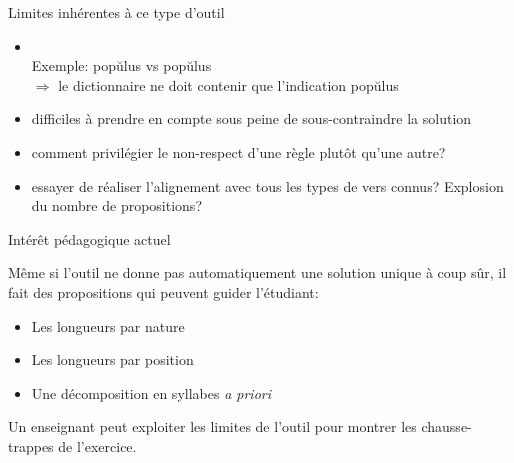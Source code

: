 \documentclass{beamer}
\newcommand\overtxt[2]{\makebox[0cm][l]{\color{diacrit}#1}#2}
\newcommand\hlbr{\overtxt{\u~}}
\newcommand\hllg{\overtxt{\=~}}
\begin{document}
\begin{frame}{Limites inhérentes à ce type d'outil}

\begin{itemize}
\item {}\\
Exemple: p\hlbr{o}p\u{u}lus vs p\hllg{o}p\u{u}lus \\
$\Rightarrow$ le dictionnaire ne doit contenir que l'indication pop\u{u}lus

\vfill

\item {} difficiles à prendre en compte sous peine de sous-contraindre la solution

\vfill

\item {} comment privilégier le non-respect d'une règle plutôt qu'une autre?

\vfill

\item {} essayer de réaliser l'alignement avec tous les types de vers connus? Explosion du nombre de propositions?

\end{itemize}
\end{frame} %




\begin{frame}{Intérêt pédagogique actuel}

Même si l'outil ne donne pas automatiquement une solution unique à coup sûr, il fait des propositions qui peuvent guider l'étudiant:

\begin{itemize}
\item Les longueurs par nature
\item Les longueurs par position
\item Une décomposition en syllabes \emph{a priori}
\end{itemize}

\vfill

Un enseignant peut exploiter les limites de l'outil pour montrer les chausse-trappes de l'exercice.

\end{frame} %
\end{document}
